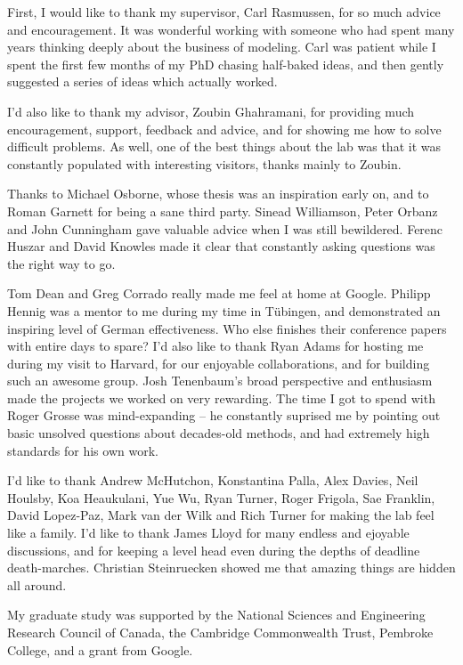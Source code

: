 
\begin{acknowledgements}      


First, I would like to thank my supervisor, Carl Rasmussen, for so much advice and encouragement.
It was wonderful working with someone who had spent many years thinking deeply about the business of modeling.
Carl was patient while I spent the first few months of my PhD chasing half-baked ideas, and then gently suggested a series of ideas which actually worked.

I'd also like to thank my advisor, Zoubin Ghahramani, for providing much encouragement, support, feedback and advice, and for showing me how to solve difficult problems.
As well, one of the best things about the lab was that it was constantly populated with interesting visitors, thanks mainly to Zoubin.

Thanks to Michael Osborne, whose thesis was an inspiration early on, and to Roman Garnett for being a sane third party.
Sinead Williamson, Peter Orbanz and John Cunningham gave valuable advice when I was still bewildered.
Ferenc Huszar and David Knowles made it clear that constantly asking questions was the right way to go.

Tom Dean and Greg Corrado really made me feel at home at Google.
Philipp Hennig was a mentor to me during my time in T\"{u}bingen, and demonstrated an inspiring level of German effectiveness.
Who else finishes their conference papers with entire days to spare?
I'd also like to thank Ryan Adams for hosting me during my visit to Harvard, for our enjoyable collaborations, and for building such an awesome group.
Josh Tenenbaum's broad perspective and enthusiasm made the projects we worked on very rewarding.
The time I got to spend with Roger Grosse was mind-expanding -- he constantly suprised me by pointing out basic unsolved questions about decades-old methods, and had extremely high standards for his own work.

I'd like to thank Andrew McHutchon, Konstantina Palla, Alex Davies, Neil Houlsby, Koa Heaukulani, Yue Wu, Ryan Turner, Roger Frigola, Sae Franklin, David Lopez-Paz, Mark van der Wilk and Rich Turner for making the lab feel like a family.
I'd like to thank James Lloyd for many endless and ejoyable discussions, and for keeping a level head even during the depths of deadline death-marches.
Christian Steinruecken showed me that amazing things are hidden all around.

My graduate study was supported by the National Sciences and Engineering Research Council of Canada, the Cambridge Commonwealth Trust, Pembroke College, and a grant from Google.

\end{acknowledgements}

